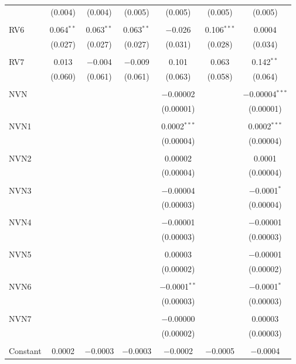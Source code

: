 \begin{table}[!htbp]
\begin{tabular}{@{\extracolsep{5pt}}lcccccc}
  & (0.004) & (0.004) & (0.005) & (0.005) & (0.005) & (0.005) \\ 
  & & & & & & \\ 
 RV6 & 0.064$^{**}$ & 0.063$^{**}$ & 0.063$^{**}$ & $-$0.026 & 0.106$^{***}$ & 0.0004 \\ 
  & (0.027) & (0.027) & (0.027) & (0.031) & (0.028) & (0.034) \\ 
  & & & & & & \\ 
 RV7 & 0.013 & $-$0.004 & $-$0.009 & 0.101 & 0.063 & 0.142$^{**}$ \\ 
  & (0.060) & (0.061) & (0.061) & (0.063) & (0.058) & (0.064) \\ 
  & & & & & & \\ 
 NVN &  &  &  & $-$0.00002 &  & $-$0.00004$^{***}$ \\ 
  &  &  &  & (0.00001) &  & (0.00001) \\ 
  & & & & & & \\ 
 NVN1 &  &  &  & 0.0002$^{***}$ &  & 0.0002$^{***}$ \\ 
  &  &  &  & (0.00004) &  & (0.00004) \\ 
  & & & & & & \\ 
 NVN2 &  &  &  & 0.00002 &  & 0.0001 \\ 
  &  &  &  & (0.00004) &  & (0.00004) \\ 
  & & & & & & \\ 
 NVN3 &  &  &  & $-$0.00004 &  & $-$0.0001$^{*}$ \\ 
  &  &  &  & (0.00003) &  & (0.00004) \\ 
  & & & & & & \\ 
 NVN4 &  &  &  & $-$0.00001 &  & $-$0.00001 \\ 
  &  &  &  & (0.00003) &  & (0.00003) \\ 
  & & & & & & \\ 
 NVN5 &  &  &  & 0.00003 &  & $-$0.00001 \\ 
  &  &  &  & (0.00002) &  & (0.00002) \\ 
  & & & & & & \\ 
 NVN6 &  &  &  & $-$0.0001$^{**}$ &  & $-$0.0001$^{*}$ \\ 
  &  &  &  & (0.00003) &  & (0.00003) \\ 
  & & & & & & \\ 
 NVN7 &  &  &  & $-$0.00000 &  & 0.00003 \\ 
  &  &  &  & (0.00002) &  & (0.00003) \\ 
  & & & & & & \\ 
 Constant & 0.0002 & $-$0.0003 & $-$0.0003 & $-$0.0002 & $-$0.0005 & $-$0.0004 \\ 

\end{tabular}
\end{table}
